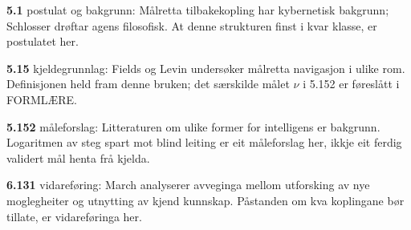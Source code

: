 \begin{widebody}
\noindent\hypertarget{kjeldenotat-5.1}{}\textbf{5.1} postulat og bakgrunn: Målretta tilbakekopling har kybernetisk bakgrunn; Schlosser drøftar agens filosofisk. At denne strukturen finst i kvar klasse, er postulatet her.\par\medskip
\noindent\hypertarget{kjeldenotat-5.15}{}\textbf{5.15} kjeldegrunnlag: Fields og Levin undersøker målretta navigasjon i ulike rom. Definisjonen held fram denne bruken; det særskilde målet \ensuremath{ν} i 5.152 er føreslått i FORMLÆRE.\par\medskip
\noindent\hypertarget{kjeldenotat-5.152}{}\textbf{5.152} måleforslag: Litteraturen om ulike former for intelligens er bakgrunn. Logaritmen av steg spart mot blind leiting er eit måleforslag her, ikkje eit ferdig validert mål henta frå kjelda.\par\medskip
\noindent\hypertarget{kjeldenotat-6.131}{}\textbf{6.131} vidareføring: March analyserer avveginga mellom utforsking av nye moglegheiter og utnytting av kjend kunnskap. Påstanden om kva koplingane bør tillate, er vidareføringa her.\par\medskip
\end{widebody}
